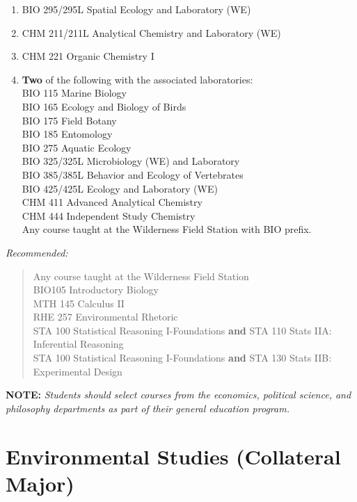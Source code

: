 \documentclass[
  letterpaper,
]{scrbook}
\providecommand{\tightlist}{%
  \setlength{\itemsep}{0pt}\setlength{\parskip}{0pt}}
\begin{document}
\begin{enumerate}
\def\labelenumi{\arabic{enumi}.}
\setcounter{enumi}{1}
\tightlist
\item
  BIO 295/295L Spatial Ecology and Laboratory (WE)
\item
  CHM 211/211L Analytical Chemistry and Laboratory (WE)
\item
  CHM 221 Organic Chemistry I\\
\item
  \textbf{Two} of the following with the associated laboratories:\\
  BIO 115 Marine Biology\\
  BIO 165 Ecology and Biology of Birds\\
  BIO 175 Field Botany\\
  BIO 185 Entomology\\
  BIO 275 Aquatic Ecology\\
  BIO 325/325L Microbiology (WE) and Laboratory\\
  BIO 385/385L Behavior and Ecology of Vertebrates\\
  BIO 425/425L Ecology and Laboratory (WE)\\
  CHM 411 Advanced Analytical Chemistry\\
  CHM 444 Independent Study Chemistry\\
  Any course taught at the Wilderness Field Station with BIO prefix.
\end{enumerate}

\emph{Recommended:}

\begin{quote}
Any course taught at the Wilderness Field Station\\
BIO105 Introductory Biology\\
MTH 145 Calculus II\\
RHE 257 Environmental Rhetoric\\
STA 100 Statistical Reasoning I-Foundations \textbf{and} STA 110 Stats
IIA: Inferential Reasoning\\
STA 100 Statistical Reasoning I-Foundations \textbf{and} STA 130 Stats
IIB: Experimental Design
\end{quote}

\textbf{NOTE:} \emph{Students should select courses from the economics,
political science, and philosophy departments as part of their general
education program.}

\section{Environmental Studies (Collateral
Major)}\label{sec-environmental-studies}
\end{document}

